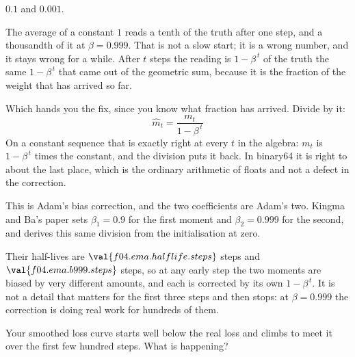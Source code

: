 \begin{fr}
\begin{ansblock}
$\num{0.1}$ and $\num{0.001}$.
\end{ansblock}

The average of a constant $1$ reads a tenth of the truth after one step, and a
thousandth of it at $\beta = \num{0.999}$. That is not a slow start; it is a
wrong number, and it stays wrong for a while. After $t$ steps the reading is
$1 - \beta^{\,t}$ of the truth \dash{} the same $1 - \beta^{\,t}$ that came
out of the geometric sum, because it is the fraction of the weight that has
arrived so far.

Which hands you the fix, since you know what fraction has arrived. Divide by
it:
\[ \hat{m}_t = \frac{m_t}{1 - \beta^{\,t}} \]
On a constant sequence that is exactly right at every $t$ in the algebra:
$m_t$ is $1 - \beta^{\,t}$ times the constant, and the division puts it back.
In binary64 it is right to about the last place, which is the ordinary
arithmetic of floats and not a defect in the correction.

\begin{aibox}
This is Adam's bias correction, and the two coefficients are Adam's two.
Kingma and Ba's paper sets $\beta_1 = \num{0.9}$ for the first moment and
$\beta_2 = \num{0.999}$ for the second, and derives this same division from
the initialisation at zero.

Their half-lives are $\val{f04.ema.halflife.steps}$ steps and
$\val{f04.ema.b999.steps}$ steps, so at any early step the two moments are
biased by very different amounts, and each is corrected by its own
$1 - \beta^{\,t}$. It is not a detail that matters for the first three steps
and then stops: at $\beta = \num{0.999}$ the correction is doing real work for
hundreds of them.
\end{aibox}

Your smoothed loss curve starts well below the real loss and climbs to meet it
over the first few hundred steps. What is happening?
\nextframe
\end{fr}

